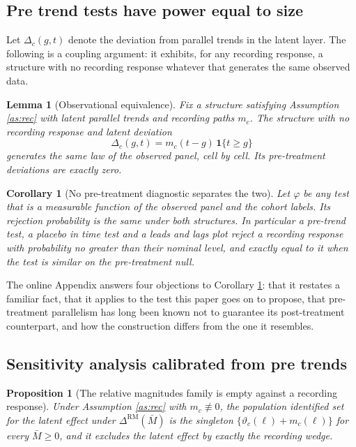 \documentclass[12pt]{article}
\newtheorem{proposition}{Proposition}
\newtheorem{lemma}{Lemma}
\newtheorem{corollary}{Corollary}
\theoremstyle{definition}
\numberwithin{equation}{section}
\begin{document}
\subsection{Pre trend tests have power equal to size}

Let $\Delta_c(g,t)$ denote the deviation from parallel trends in the latent
layer. The following is a coupling argument: it exhibits, for any recording
response, a structure with no recording response whatever that generates the
same observed data.

\begin{lemma}[Observational equivalence]
\label{lem:oe}
Fix a structure satisfying Assumption \ref{as:rec} with latent parallel trends
and recording paths $m_c$. The structure with no recording response and latent
deviation
\begin{equation}
\label{eq:equivdev}
\Delta_c(g,t) = m_c(t-g)\,\mathbf 1\{t \ge g\}
\end{equation}
generates the same law of the observed panel, cell by cell. Its pre-treatment deviations are exactly zero.
\end{lemma}

\begin{corollary}[No pre-treatment diagnostic separates the two]
\label{cor:blind}
Let $\varphi$ be any test that is a measurable function of the observed panel
and the cohort labels. Its rejection probability is the same under both
structures. In particular a pre-trend test, a placebo in time test and a
leads and lags plot reject a recording response with probability no greater than
their nominal level, and exactly equal to it when the test is similar on the
pre-treatment null.
\end{corollary}

The online Appendix answers four objections to Corollary \ref{cor:blind}: that
it restates a familiar fact, that it applies to the test this paper goes on to
propose, that pre-treatment parallelism has long been known not to guarantee its
post-treatment counterpart, and how the construction differs from the one it
resembles.

\subsection{Sensitivity analysis calibrated from pre trends}

\begin{proposition}[The relative magnitudes family is empty against a recording response]
\label{prop:rm}
Under Assumption \ref{as:rec} with $m_c \not\equiv 0$, the population identified
set for the latent effect under $\Delta^{\mathrm{RM}}(\bar M)$ is the singleton
$\{\vartheta_c(\ell) + m_c(\ell)\}$ for every $\bar M \ge 0$, and it excludes the
latent effect by exactly the recording wedge.
\end{proposition}
\end{document}

